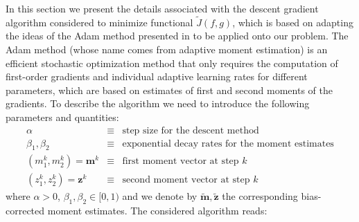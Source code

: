 \documentclass[11pt]{article}
\def \ba{\begin{array}}
\def \ea{\end{array}}
\def \m{\boldsymbol{m}}
\def \z{\boldsymbol{z}}
\numberwithin{theorem}{section}
\begin{document}
In this section we present the details associated with the descent gradient algorithm considered to minimize functional $\widetilde J(f,g)$, which is based on adapting the ideas of the Adam method presented in \cite{KB15} to be applied onto our problem. The Adam method (whose name comes from adaptive moment estimation) is an efficient stochastic optimization method that only requires the computation of first-order gradients and individual adaptive learning rates for different parameters, which are based on estimates of first and second moments of the gradients. To describe the algorithm we need to introduce the following parameters and quantities:
$$
\ba{rcl}
\alpha & \equiv & \mbox{step size for the descent method}
\\
\beta_1, \beta_2& \equiv & \mbox{exponential decay rates for the moment estimates}
 \\
(m^k_1,m^k_2)=\m^k& \equiv & \mbox{first moment vector at step $k$}
 \\
(z^k_1,z^k_2)=\z^k& \equiv & \mbox{second moment vector at step $k$}
\ea
$$
where $\alpha>0$, $\beta_1,\beta_2\in[0,1)$ and we denote by $\widetilde{\m}, \widetilde{\z}$ the corresponding bias-corrected moment estimates. The considered algorithm reads:
\end{document}
